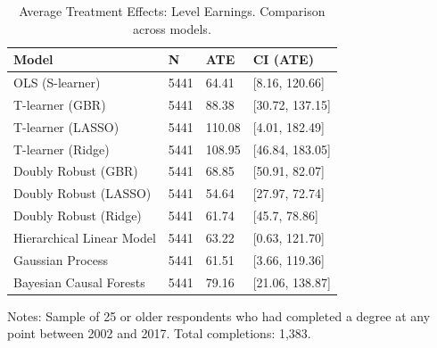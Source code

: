 \documentclass[12pt, a4paper]{article}
\begin{document}
\begin{landscape}
\clearpage
\begin{table}[htbp]
\centering
\small
\caption{Average Treatment Effects: Level Earnings. Comparison across models.}
\begin{tabular}{p{} C{0.1\textwidth} C{0.1\textwidth} C{0.2\textwidth}}
\toprule
Model  &  N  &  ATE  &  CI (ATE)  \\
\midrule 	   						
OLS (S-learner)	 & 	5441	 & 	64.41	 & 	[8.16, 120.66]	 \\
T-learner (GBR)	 & 	5441	 & 	88.38	 & 	[30.72, 137.15]	 \\
T-learner (LASSO)	 & 	5441	 & 	110.08	 & 	[4.01, 182.49]	 \\
T-learner (Ridge)	 & 	5441	 & 	108.95	 & 	[46.84, 183.05]	 \\
Doubly Robust (GBR)	 & 	5441	 & 	68.85	 & [50.91, 82.07] \\
Doubly Robust (LASSO)	 & 	5441	 & 	54.64	 & 	[27.97, 72.74]	 \\
Doubly Robust (Ridge)	 & 	5441	 & 	61.74	 & 	[45.7, 78.86]	 \\
Hierarchical Linear Model	 & 	5441	 & 	63.22 & [0.63, 121.70]  \\
Gaussian Process  & 	5441	 & 	61.51	 & 	[3.66, 119.36]	 \\
Bayesian Causal Forests  & 5441 & 79.16 & [21.06, 138.87] \\
\bottomrule
\end{tabular}
\par\medskip
\parbox{1.0\textwidth}{\footnotesize Notes: Sample of 25 or older respondents who had completed a degree at any point between 2002 and 2017. Total completions: 1,383.}
\label{tab:atebslvl}
\end{table}










\end{landscape}
\end{document}
